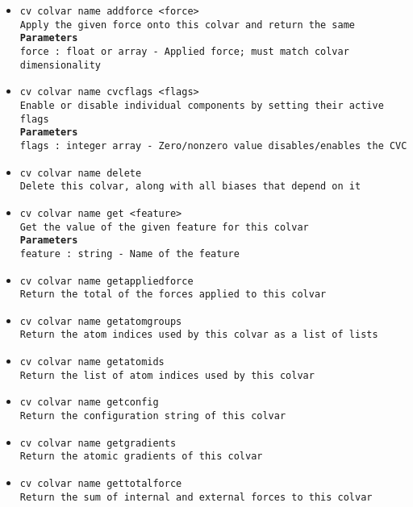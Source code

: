 \begin{itemize}
\item \texttt{cv colvar name addforce <force>}
\\
\texttt{Apply the given force onto this colvar and return the same}
\\
\texttt{\textbf{Parameters}}
\\
\texttt{force : float or array - Applied force; must match colvar dimensionality}
\item \texttt{cv colvar name cvcflags <flags>}
\\
\texttt{Enable or disable individual components by setting their active flags}
\\
\texttt{\textbf{Parameters}}
\\
\texttt{flags : integer array - Zero/nonzero value disables/enables the CVC}
\item \texttt{cv colvar name delete}
\\
\texttt{Delete this colvar, along with all biases that depend on it}
\item \texttt{cv colvar name get <feature>}
\\
\texttt{Get the value of the given feature for this colvar}
\\
\texttt{\textbf{Parameters}}
\\
\texttt{feature : string - Name of the feature}
\item \texttt{cv colvar name getappliedforce}
\\
\texttt{Return the total of the forces applied to this colvar}
\item \texttt{cv colvar name getatomgroups}
\\
\texttt{Return the atom indices used by this colvar as a list of lists}
\item \texttt{cv colvar name getatomids}
\\
\texttt{Return the list of atom indices used by this colvar}
\item \texttt{cv colvar name getconfig}
\\
\texttt{Return the configuration string of this colvar}
\item \texttt{cv colvar name getgradients}
\\
\texttt{Return the atomic gradients of this colvar}
\item \texttt{cv colvar name gettotalforce}
\\
\texttt{Return the sum of internal and external forces to this colvar}

\end{itemize}
